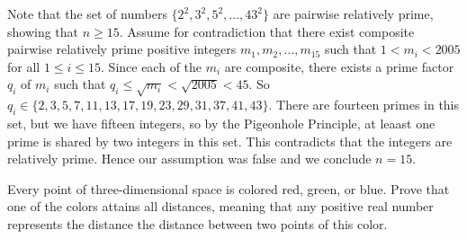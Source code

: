 \begin{solution}
    Note that the set of numbers $\{2^2, 3^2, 5^2, \dots, 43^2 \}$ are pairwise relatively prime,
    showing that $n \geq 15$. Assume for contradiction that there exist composite pairwise relatively
    prime positive integers $m_1, m_2, \dots, m_{15}$ such that $1 < m_i < 2005$ for all
    $1 \leq i \leq 15$. Since each of the $m_i$ are composite, there exists a prime factor $q_i$ of
    $m_i$ such that $q_i \leq \sqrt{m_i} < \sqrt{2005} < 45$. So 
    $q_i \in \{ 2, 3, 5, 7, 11, 13, 17, 19, 23, 29, 31, 37, 41, 43 \}$. There are
    fourteen primes in this set, but we have fifteen integers, so by the Pigeonhole Principle, at leaast
    one prime is shared by two integers in this set. This contradicts that 
    the integers are relatively prime. Hence our assumption was false and we conclude
    $n = 15$.
\end{solution}

\begin{problem}
    Every point of three-dimensional space is colored red, green, or blue. Prove that one
    of the colors attains all distances, meaning that any positive real number represents the distance
    the distance between two points of this color.
\end{problem}

